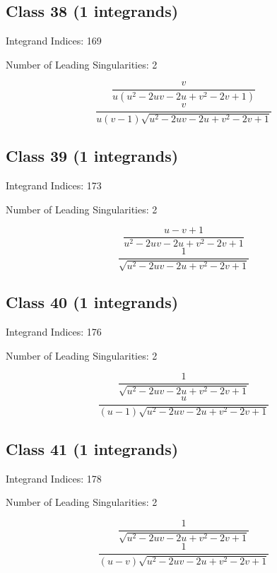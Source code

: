 \documentclass[11pt,a4paper]{article}
\begin{document}
\subsection*{Class 38 (1 integrands)}
Integrand Indices: 169

Number of Leading Singularities: 2

\begin{equation}
\frac{v}{u \left(u^2-2 u v-2 u+v^2-2 v+1\right)}
\end{equation}
\begin{equation}
\frac{v}{u (v-1) \sqrt{u^2-2 u v-2 u+v^2-2 v+1}}
\end{equation}


\subsection*{Class 39 (1 integrands)}
Integrand Indices: 173

Number of Leading Singularities: 2

\begin{equation}
\frac{u-v+1}{u^2-2 u v-2 u+v^2-2 v+1}
\end{equation}
\begin{equation}
\frac{1}{\sqrt{u^2-2 u v-2 u+v^2-2 v+1}}
\end{equation}


\subsection*{Class 40 (1 integrands)}
Integrand Indices: 176

Number of Leading Singularities: 2

\begin{equation}
\frac{1}{\sqrt{u^2-2 u v-2 u+v^2-2 v+1}}
\end{equation}
\begin{equation}
\frac{u}{(u-1) \sqrt{u^2-2 u v-2 u+v^2-2 v+1}}
\end{equation}


\subsection*{Class 41 (1 integrands)}
Integrand Indices: 178

Number of Leading Singularities: 2

\begin{equation}
\frac{1}{\sqrt{u^2-2 u v-2 u+v^2-2 v+1}}
\end{equation}
\begin{equation}
\frac{1}{(u-v) \sqrt{u^2-2 u v-2 u+v^2-2 v+1}}
\end{equation}
\end{document}
